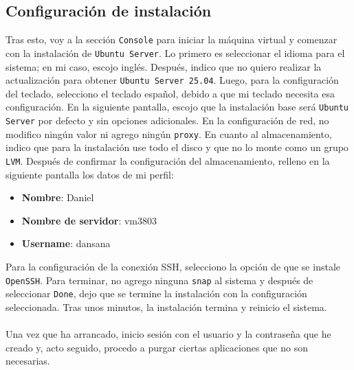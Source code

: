 \documentclass[10pt]{article}
\begin{document}
	\subsection{Configuración de instalación}
	Tras esto, voy a la sección \verb|Console| para iniciar la máquina virtual y comenzar con la instalación de \verb|Ubuntu Server|. Lo primero es seleccionar el idioma para el sistema; en mi caso, escojo inglés. Después, indico que no quiero realizar la actualización para obtener \verb|Ubuntu Server 25.04|. Luego, para la configuración del teclado, selecciono el teclado español, debido a que mi teclado necesita esa configuración. En la siguiente pantalla, escojo que la instalación base será \verb|Ubuntu Server| por defecto y sin opciones adicionales. En la configuración de red, no modifico ningún valor ni agrego ningún \verb|proxy|. En cuanto al almacenamiento, indico que para la instalación use todo el disco y que no lo monte como un grupo \verb|LVM|. Después de confirmar la configuración del almacenamiento, relleno en la siguiente pantalla los datos de mi perfil:
	\begin{itemize}
		\item \textbf{Nombre}: Daniel
		\item \textbf{Nombre de servidor}: vm3803
		\item \textbf{Username}: dansana
	\end{itemize}
	Para la configuración de la conexión SSH, selecciono la opción de que se instale \verb|OpenSSH|. Para terminar, no agrego ninguna \verb|snap| al sistema y después de seleccionar \verb|Done|, dejo que se termine la instalación con la configuración seleccionada. Tras unos minutos, la instalación termina y reinicio el sistema.\\\\
	Una vez que ha arrancado, inicio sesión con el usuario y la contraseña que he creado y, acto seguido, procedo a purgar ciertas aplicaciones que no son necesarias.
\end{document}
